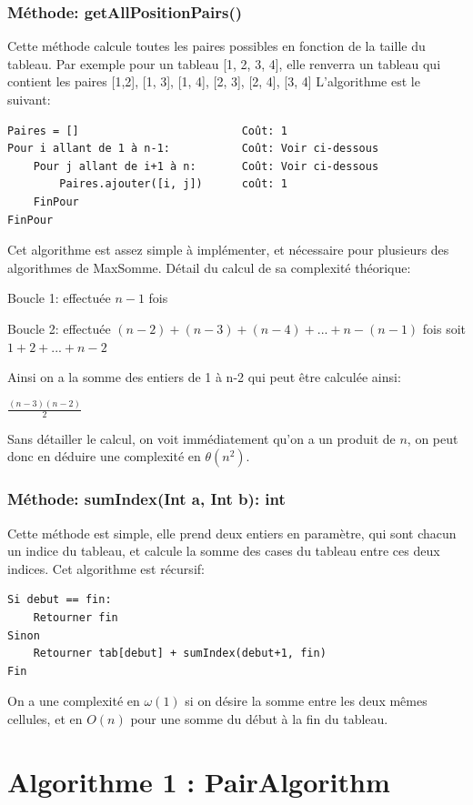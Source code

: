 \documentclass[a4paper, 12pt]{article}
\begin{document}
\subsubsection{Méthode: getAllPositionPairs()}
Cette méthode calcule toutes les paires possibles en fonction de la taille du tableau. Par exemple pour un tableau [1, 2, 3, 4], elle renverra un tableau qui contient les paires {[1,2], [1, 3], [1, 4], [2, 3], [2, 4], [3, 4]}
L'algorithme est le suivant:
\begin{verbatim}
Paires = []                         Coût: 1 
Pour i allant de 1 à n-1:           Coût: Voir ci-dessous
    Pour j allant de i+1 à n:       Coût: Voir ci-dessous
        Paires.ajouter([i, j])      coût: 1
    FinPour
FinPour
\end{verbatim}
Cet algorithme est assez simple à implémenter, et nécessaire pour plusieurs des algorithmes de MaxSomme. 
Détail du calcul de sa complexité théorique:

Boucle 1: effectuée $n-1$ fois

Boucle 2: effectuée $(n-2) + (n-3) + (n-4) + ... + n-(n-1)$ fois
soit $1 + 2 + ... + n-2$

Ainsi on a la somme des entiers de 1 à n-2 qui peut être calculée ainsi:

\begin {center}
$\frac{(n-3)(n-2)}{2}$
\end{center}

Sans détailler le calcul, on voit immédiatement qu'on a un produit de $n$, on peut donc en déduire une complexité en $\theta(n^2)$.

\subsubsection{Méthode: sumIndex(Int a, Int b): int}
Cette méthode est simple, elle prend deux entiers en paramètre, qui sont chacun un indice du tableau, et calcule la somme des cases du tableau entre ces deux indices. Cet algorithme est récursif:
\begin{verbatim}
Si debut == fin:
    Retourner fin
Sinon 
    Retourner tab[debut] + sumIndex(debut+1, fin)
Fin
\end{verbatim}
On a une complexité en $\omega(1)$ si on désire la somme entre les deux mêmes cellules, et en $O(n)$ pour une somme du début à la fin du tableau.
\section{Algorithme 1 : PairAlgorithm}
\end{document}
